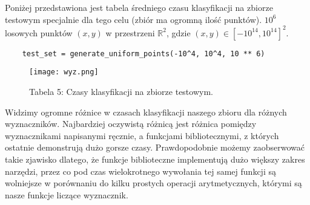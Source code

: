 \quad Poniżej przedstawiona jest tabela średniego czasu klasyfikacji na 
zbiorze testowym specjalnie dla tego celu (zbiór ma ogromną ilość punktów).
$10^6$ losowych punktów $(x, y)$ w przestrzeni $\mathbb{R}^2$, gdzie $(x, y) \in \left[-10^{14},10^{14}\right]^{2}$.
\begin{lstlisting}
    test_set = generate_uniform_points(-10^4, 10^4, 10 ** 6)
\end{lstlisting}
\begin{figure}[htb]
    \centering 
    \texttt{[image: wyz.png]}\par
    \caption*{Tabela 5: Czasy klasyfikacji na zbiorze testowym. }
\end{figure}
\quad Widzimy ogromne różnice w czasach klasyfikacji naszego zbioru dla różnych wyznaczników. 
Najbardziej oczywistą różnicą jest różnica pomiędzy wyznacznikami napisanymi ręcznie, a 
funkcjami bibliotecznymi, z których ostatnie demonstrują dużo gorsze czasy. 
Prawdopodobnie możemy zaobserwować takie zjawisko dlatego, że funkcje biblioteczne implementują dużo większy zakres 
narzędzi, przez co pod czas wielokrotnego wywołania tej samej funkcji są wolniejsze w porównaniu do 
kilku prostych operacji arytmetycznych, którymi są nasze funkcje liczące wyznacznik. 